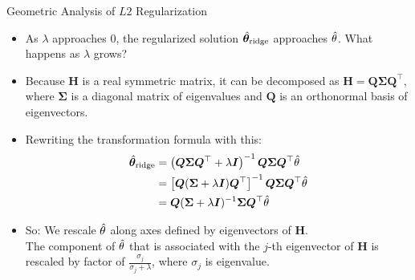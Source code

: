 \documentclass[11pt,compress,t,notes=noshow, xcolor=table]{beamer}
\begin{document}
\begin{vbframe}{Geometric Analysis of $L2$ Regularization}

  \begin{itemize}
    \item As $\lambda$ approaches $0$, the regularized solution $\hat{\bm{\theta}}_{\text{ridge}}$ approaches $\hat{\theta}$. What happens as $\lambda$ grows?
    \item Because $\bm{H}$ is a real symmetric matrix, it can be decomposed as $\bm{H} = \bm{Q} \bm{\Sigma} \bm{Q}^\top$, where $\bm{\Sigma}$ is a diagonal matrix of eigenvalues and $\bm{Q}$ is an orthonormal basis of eigenvectors.
    \item Rewriting the transformation formula with this:
  \begin{equation*}
    \begin{aligned} 
    \hat{\bm{\theta}}_{\text{ridge}} &=\left(\bm{Q} \bm{\Sigma} \bm{Q}^{\top}+\lambda \bm{I}\right)^{-1} \bm{Q} \bm{\Sigma} \bm{Q}^{\top} \hat{\theta} \\ 
              &=\left[\bm{Q}(\bm{\Sigma}+\lambda \bm{I}) \bm{Q}^{\top}\right]^{-1} \bm{Q} \bm{\Sigma} \bm{Q}^{\top} \hat{\theta} \\ 
              &=\bm{Q}(\bm{\Sigma} + \lambda \bm{I})^{-1} \bm{\Sigma} \bm{Q}^{\top} \hat{\theta} 
    \end{aligned}
  \end{equation*}
    \item So: We rescale $\hat{\theta}$ along axes defined by eigenvectors of $\bm{H}$. \\
    The component of $\hat{\theta}$ that is associated with the $j$-th eigenvector of $\bm{H}$ is rescaled by factor of $\frac{\sigma_j}{\sigma_j + \lambda}$, where $\sigma_j$ is eigenvalue.
\end{itemize}

\end{vbframe}
\end{document}
